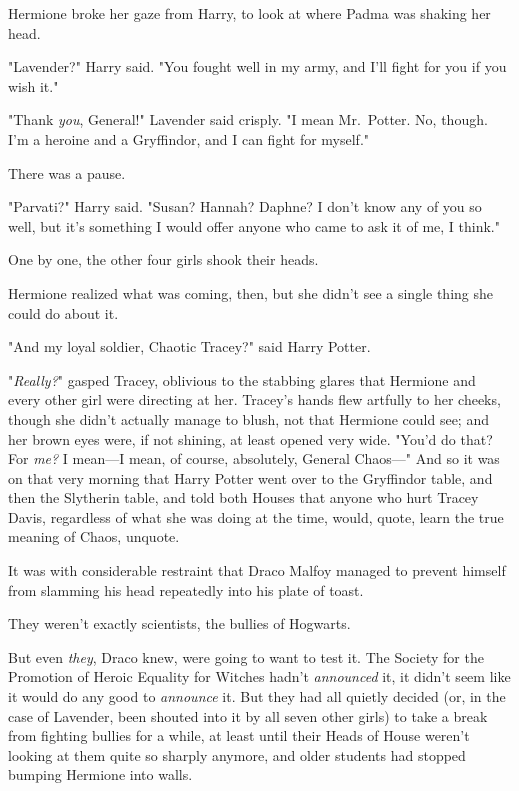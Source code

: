 Hermione broke her gaze from Harry, to look at where Padma was shaking her head.

"Lavender?" Harry said. "You fought well in my army, and I'll fight for you if
you wish it."

"Thank \emph{you}, General!" Lavender said crisply. "I mean Mr.~Potter. No,
though. I'm a heroine and a Gryffindor, and I can fight for myself."

There was a pause.

"Parvati?" Harry said. "Susan? Hannah? Daphne? I don't know any of you so well,
but it's something I would offer anyone who came to ask it of me, I think."

One by one, the other four girls shook their heads.

Hermione realized what was coming, then, but she didn't see a single thing she
could do about it.

"And my loyal soldier, Chaotic Tracey?" said Harry Potter.

"\emph{Really?}" gasped Tracey, oblivious to the stabbing glares that Hermione
and every other girl were directing at her. Tracey's hands flew artfully to her
cheeks, though she didn't actually manage to blush, not that Hermione could
see; and her brown eyes were, if not shining, at least opened very wide. "You'd
do that? For \emph{me?} I mean---I mean, of course, absolutely, General
Chaos\mbox{---}"
\sbreak
And so it was on that very morning that Harry Potter went over to the
Gryffindor table, and then the Slytherin table, and told both Houses that
anyone who hurt Tracey Davis, regardless of what she was doing at the time,
would, quote, learn the true meaning of Chaos, unquote.

It was with considerable restraint that Draco Malfoy managed to prevent himself
from slamming his head repeatedly into his plate of toast.

They weren't exactly scientists, the bullies of Hogwarts.

But even \emph{they}, Draco knew, were going to want to test it.
\sbreak
The Society for the Promotion of Heroic Equality for Witches hadn't
\emph{announced} it, it didn't seem like it would do any good to
\emph{announce} it. But they had all quietly decided (or, in the case of
Lavender, been shouted into it by all seven other girls) to take a break from
fighting bullies for a while, at least until their Heads of House weren't
looking at them quite so sharply anymore, and older students had stopped
bumping Hermione into walls.

